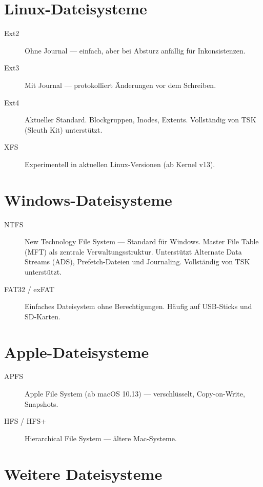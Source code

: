 \section{Linux-Dateisysteme}

\begin{description}
	\item[Ext2] Ohne Journal — einfach, aber bei Absturz anfällig für Inkonsistenzen.
	\item[Ext3] Mit Journal — protokolliert Änderungen vor dem Schreiben.
	\item[Ext4] Aktueller Standard.
		Blockgruppen, Inodes, Extents.
		Vollständig von TSK (Sleuth Kit) unterstützt.
	\item[XFS] Experimentell in aktuellen Linux-Versionen (ab Kernel v13).
\end{description}

\section{Windows-Dateisysteme}

\begin{description}
	\item[NTFS] New Technology File System — Standard für Windows.
		Master File Table (MFT) als zentrale Verwaltungsstruktur.
		Unterstützt Alternate Data Streams (ADS), Prefetch-Dateien und Journaling.
		Vollständig von TSK unterstützt.
	\item[FAT32 / exFAT] Einfaches Dateisystem ohne Berechtigungen.
		Häufig auf USB-Sticks und SD-Karten.
\end{description}

\section{Apple-Dateisysteme}

\begin{description}
	\item[APFS] Apple File System (ab macOS 10.13) — verschlüsselt, Copy-on-Write, Snapshots.
	\item[HFS / HFS+] Hierarchical File System — ältere Mac-Systeme.
\end{description}

\section{Weitere Dateisysteme}

